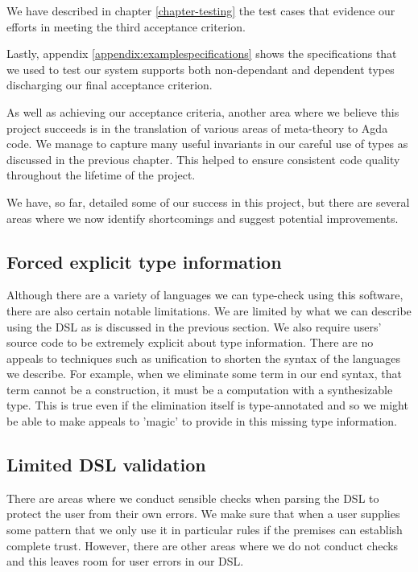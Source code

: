 We have described in chapter \ref{chapter-testing} the test cases that
evidence our efforts in meeting the third acceptance criterion.

Lastly, appendix \ref{appendix:examplespecifications} shows the
specifications that we used to test our system supports both
non-dependant and dependent types discharging our final acceptance
criterion.

As well as achieving our acceptance criteria, another area where we
believe this project succeeds is in the translation of various areas of
meta-theory to Agda code. We manage to capture many useful invariants
in our careful use of types as discussed in the previous chapter. This
helped to ensure consistent code quality throughout the lifetime of
the project. 

We have, so far, detailed some of our success in this project, but there
are several areas where we now identify shortcomings and suggest
potential improvements.

\subsection{Forced explicit type information}

Although there are a variety of languages we can type-check
using this software, there are also certain notable limitations. We
are limited by what we can describe using the
DSL as is discussed in the previous section. We also require users'
source code to be extremely explicit about type information. There are
no appeals to techniques such as unification to shorten the
syntax of the languages we describe. For example, when we eliminate
some term in our end syntax, that term cannot be a construction, it
must be a computation with a synthesizable type. This is true even if
the elimination itself is type-annotated and so we might be able to
make appeals to 'magic' to provide in this missing type information.

\subsection{Limited DSL validation}

There are areas where we conduct sensible checks when parsing the DSL
to protect the user from their own errors. We make sure that
when a user supplies some pattern that we only use it in particular
rules if the premises can establish complete trust. However,
there are other areas where we do not conduct checks and this leaves
room for user errors in our DSL.

